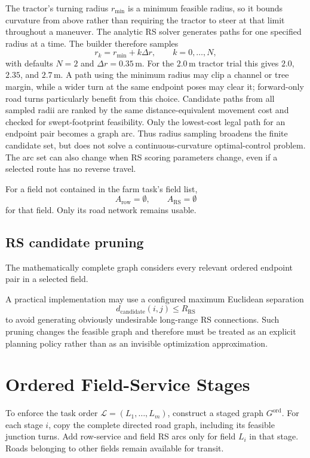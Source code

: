 \documentclass{article}
\begin{document}
The tractor's turning radius $r_{\min}$ is a minimum feasible radius, so it bounds curvature from above rather than requiring the tractor to steer at that limit throughout a maneuver. The analytic RS solver generates paths for one specified radius at a time. The builder therefore samples
\[
r_k=r_{\min}+k\Delta r,\qquad k=0,\ldots,N,
\]
with defaults $N=2$ and $\Delta r=0.35\,$m. For the $2.0\,$m tractor trial this gives $2.0$, $2.35$, and $2.7\,$m. A path using the minimum radius may clip a channel or tree margin, while a wider turn at the same endpoint poses may clear it; forward-only road turns particularly benefit from this choice. Candidate paths from all sampled radii are ranked by the same distance-equivalent movement cost and checked for swept-footprint feasibility. Only the lowest-cost legal path for an endpoint pair becomes a graph arc. Thus radius sampling broadens the finite candidate set, but does not solve a continuous-curvature optimal-control problem. The arc set can also change when RS scoring parameters change, even if a selected route has no reverse travel.

For a field not contained in the farm task's field list,
$$
A_{\mathrm{row}} = \emptyset,
\qquad
A_{\mathrm{RS}} = \emptyset
$$
for that field.
Only its road network remains usable.

\subsection{RS candidate pruning}

The mathematically complete graph considers every relevant ordered endpoint pair in a selected field.

A practical implementation may use a configured maximum Euclidean separation
$$
d_{\mathrm{candidate}}(i,j)
\leq R_{\mathrm{RS}}
$$
to avoid generating obviously undesirable long-range RS connections.
Such pruning changes the feasible graph and therefore must be treated as an explicit planning policy rather than as an invisible optimization approximation.

\section{Ordered Field-Service Stages}

To enforce the task order $\mathcal{L}=(L_1,\ldots,L_m)$, construct a staged graph $G^{\mathrm{ord}}$. For each stage $i$, copy the complete directed road graph, including its feasible junction turns. Add row-service and field RS arcs only for field $L_i$ in that stage. Roads belonging to other fields remain available for transit.
\end{document}
